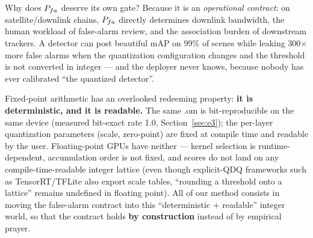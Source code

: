 Why does $P_{fa}$ deserve its own gate?
Because it is an \emph{operational contract}: on satellite/downlink chains, $P_{fa}$ directly determines downlink bandwidth, the human workload of false-alarm review, and the association burden of downstream trackers.
A detector can post beautiful mAP on 99\% of scenes while leaking 300$\times$ more false alarms when the quantization configuration changes and the threshold is not converted in integer --- and the deployer never knows, because nobody has ever calibrated ``the quantized detector''.

Fixed-point arithmetic has an overlooked redeeming property: \textbf{it is deterministic, and it is readable.}
The same .om is bit-reproducible on the same device (measured bit-exact rate 1.0, Section~\ref{sec:e3}); the per-layer quantization parameters (scale, zero-point) are fixed at compile time and readable by the user.
Floating-point GPUs have neither --- kernel selection is runtime-dependent, accumulation order is not fixed, and scores do not land on any compile-time-readable integer lattice (even though explicit-QDQ frameworks such as TensorRT/TFLite also export scale tables, ``rounding a threshold onto a lattice'' remains undefined in floating point).
All of our method consists in moving the false-alarm contract into this ``deterministic + readable'' integer world, so that the contract holds \textbf{by construction} instead of by empirical prayer.

